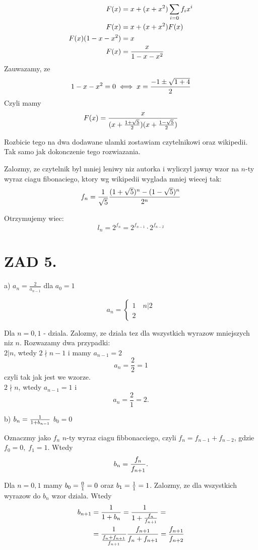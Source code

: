 \documentclass{article}[13pt]
\begin{document}
    \begin{align*}
        F(x)&=x+(x+x^2)\sum\limits_{i=0}f_ix^i\\
        F(x)&=x+(x+x^2)F(x)\\
        F(x)(1-x-x^2)&=x\\
        F(x)&={x\over 1-x-x^2}
    \end{align*}
    Zauwazamy, ze 
    $$1-x-x^2=0\iff x={-1\pm\sqrt{1+4}\over 2}$$
    Czyli mamy
    $$F(x)={x\over (x+{1+\sqrt5\over 2})(x+{1-\sqrt5\over 2})}$$

    Rozbicie tego na dwa dodawane ulamki zostawiam czytelnikowi oraz wikipedii. Tak samo jak dokonczenie tego rozwiazania.
    \medskip

    Zalozmy, ze czytelnik byl mniej leniwy niz autorka i wyliczyl jawny wzor na $n$-ty wyraz ciagu fibonaciego, ktory wg wikipedii wyglada mniej wiecej tak:
    $$f_n=\frac1{\sqrt5}{(1+\sqrt5)^n-(1-\sqrt5)^n\over 2^n}$$

    Otrzymujemy wiec:
    $$l_n=2^{f_n}=2^{f_{n-1}}\cdot 2^{f_{n-2}}$$


    \section*{ZAD 5.}

    a) $a_n=\frac 2{a_{n-1}}$ dla $a_0=1$

    $$a_n=\begin{cases}
        1\quad n|2\\
        2
    \end{cases}$$

    Dla $n=0, 1$ - dziala. Zalozmy, ze dziala tez dla wszystkich wyrazow mniejszych niz $n$. Rozwazamy dwa przypadki:\smallskip\\
    \indent $2|n$, wtedy $2\nmid n-1$ i mamy $a_{n-1}=2$
    $$a_n=\frac22=1$$
    czyli tak jak jest we wzorze.\smallskip\\
    \indent $2\nmid n$, wtedy $a_{n-1}=1$ i
    $$a_n=\frac21=2.$$

    \medskip

    b) $b_n={1\over 1+b_{n-1}}$ $b_0=0$
    \medskip

    Oznaczmy jako $f_n$ $n$-ty wyraz ciagu fibbonacciego, czyli $f_n=f_{n-1}+f_{n-2}$, gdzie $f_0=0,\;f_1=1$. Wtedy 
    $$b_n={f_n\over f_{n+1}}.$$

    Dla $n=0, 1$ mamy $b_0={0\over1}=0$ oraz $b_1={1\over1}=1$. Zalozmy, ze dla wszystkich wyrazow do $b_n$ wzor dziala. Wtedy
    \begin{align*}
        b_{n+1}&={1\over 1+b_{n}}={1\over 1+{f_{n}\over f_{n+1}}}=\\
        &={1\over {f_n+f_{n+1}\over f_{n+1}}}{f_{n+1}\over f_n+f_{n+1}}={f_{n+1}\over f_{n+2}}
    \end{align*}
\end{document}
